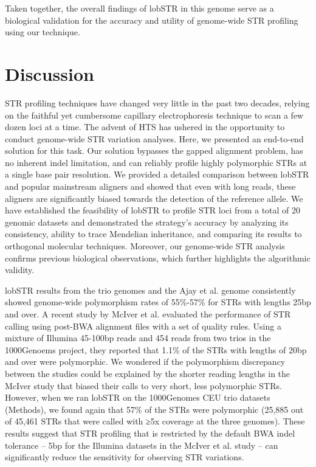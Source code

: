 Taken together, the overall findings of lobSTR in this genome serve as a biological validation for the accuracy and utility of genome-wide STR profiling using our technique.

\section{Discussion}
STR profiling techniques have changed very little in the past two decades, relying on the faithful yet cumbersome capillary electrophoresis technique to scan a few dozen loci at a time. The advent of HTS has ushered in the opportunity to conduct genome-wide STR variation analyses. Here, we presented an end-to-end solution for this task. Our solution bypasses the gapped alignment problem, has no inherent indel limitation, and can reliably profile highly polymorphic STRs at a single base pair resolution. We provided a detailed comparison between lobSTR and popular mainstream aligners and showed that even with long reads, these aligners are significantly biased towards the detection of the reference allele. We have established the feasibility of lobSTR to profile STR loci from a total of 20 genomic datasets and demonstrated the strategy’s accuracy by analyzing its consistency, ability to trace Mendelian inheritance, and comparing its results to orthogonal molecular techniques. Moreover, our genome-wide STR analysis confirms previous biological observations, which further highlights the algorithmic validity. 

lobSTR results from the trio genomes and the Ajay et al. genome consistently showed genome-wide polymorphism rates of 55\%-57\% for STRs with lengths 25bp and over. A recent study by McIver et al. \cite{McIverFondonSkinnerEtAl2011} evaluated the performance of STR calling using post-BWA alignment files with a set of quality rules. Using a mixture of Illumina 45-100bp reads and 454 reads from two trios in the 1000Genoems project, they reported that 1.1\% of the STRs with lengths of 20bp and over were polymorphic. We wondered if the polymorphism discrepancy between the studies could be explained by the shorter reading lengths in the McIver study that biased their calls to very short, less polymorphic STRs. However, when we ran lobSTR on the 1000Genomes CEU trio datasets (Methods), we found again that 57\% of the STRs were polymorphic (25,885 out of 45,461 STRs that were called with ≥5x coverage at the three genomes). These results suggest that STR profiling that is restricted by the default BWA indel tolerance -- 5bp for the Illumina datasets in the McIver et al. study -- can significantly reduce the sensitivity for observing STR variations. 

